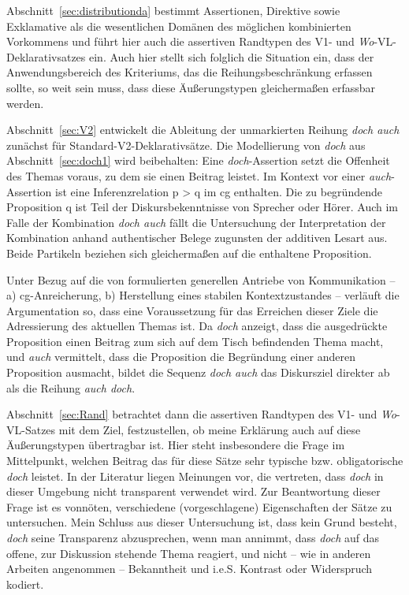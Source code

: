 Abschnitt~\ref{sec:distributionda} bestimmt Assertionen, Direktive sowie Exklamative als die wesentlichen Domänen des möglichen kombinierten Vorkommens und führt hier auch die  assertiven Randtypen  des V1- und \textit{Wo}-VL-Deklarativsatzes ein. Auch hier stellt sich folglich die Situation ein, dass der Anwendungsbereich des Kriteriums, das die Reihungsbeschränkung erfassen sollte, so weit sein muss, dass diese Äußerungs\-typen gleichermaßen erfassbar werden.

Abschnitt~\ref{sec:V2} entwickelt die Ableitung der unmarkierten Reihung \textit{doch auch} zunächst für Standard-V2-Deklarativsätze. Die Modellierung von \textit{doch} aus Abschnitt~\ref{sec:doch1} wird beibehalten: Eine \textit{doch}-Assertion setzt die Offenheit des Themas voraus, zu dem sie einen Beitrag leistet. Im Kontext vor einer \textit{auch}-Assertion ist eine  Inferenzrelation p > q im cg enthalten. Die zu begründende Proposition q ist Teil der Diskursbekenntnisse von Sprecher oder Hörer. Auch im Falle der Kombination \textit{doch auch} fällt die Untersuchung der Interpretation der Kombination anhand authentischer Belege zugunsten der additiven Lesart aus. Beide Partikeln beziehen sich gleichermaßen auf die enthaltene Proposition.

Unter Bezug auf die von \citet{Farkas2010} formulierten generellen Antriebe von Kommunikation -- a) cg-Anreicherung, b) Herstellung eines stabilen Kontextzustandes -- verläuft die Argumentation so, dass eine Voraussetzung für das Erreichen dieser Ziele die Adressierung des aktuellen Themas ist. Da \textit{doch} anzeigt, dass die ausgedrückte Proposition einen Beitrag zum sich auf dem Tisch be\-findenden Thema macht, und \textit{auch} vermittelt, dass die Proposition die Begründung einer anderen Proposition ausmacht, bildet die Sequenz \textit{doch auch} das Dis\-kursziel direkter ab als die Reihung \textit{auch doch}. 

Abschnitt~\ref{sec:Rand} betrachtet dann die assertiven Randtypen des V1- und \textit{Wo}-VL-Satzes mit dem Ziel, festzustellen, ob meine Erklärung auch auf diese Äußerungs\-typen übertragbar ist. Hier steht insbesondere die Frage im Mittelpunkt, welchen Beitrag das für diese Sätze sehr typische bzw. obligatorische \textit{doch} leistet. In der Litera\-tur liegen Meinungen vor, die vertreten, dass \textit{doch} in dieser Umgebung nicht transparent verwendet wird. Zur Beantwortung dieser Frage ist es vonnöten, verschiedene (vorgeschlagene) Eigenschaften der Sätze zu untersuchen. Mein Schluss aus dieser Untersuchung ist, dass kein Grund besteht, \textit{doch} seine Transparenz abzusprechen, wenn man annimmt, dass \textit{doch} auf das offene, zur Diskussion stehende Thema reagiert, und nicht – wie in anderen Arbeiten angenommen – Bekanntheit und i.e.S. Kontrast oder Widerspruch kodiert.

